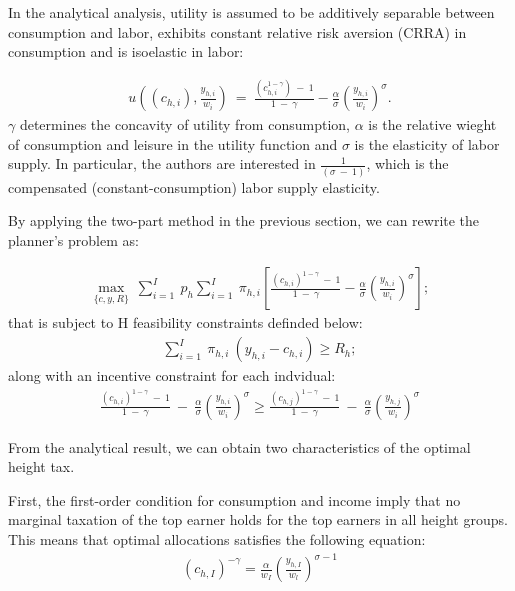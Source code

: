 \documentclass[titlepage]{\econtex}
\begin{document}
In the analytical analysis, utility is assumed to be additively separable between consumption and labor, exhibits constant relative risk aversion (CRRA) in consumption and is isoelastic in labor:

   \begin{align}
  u\left((c_{h,i}), \frac{y_{h,i}}{w_i}\right) \ = \ \frac{(c_{h,i}^{1-\gamma}) \ - \ 1}{1 \ - \ \gamma} - \frac{\alpha}{\sigma} \left(\frac{y_{h,i}}{w_i}\right)^\sigma.
   \end{align}
$\gamma$ determines the concavity of utility from consumption,  $\alpha$ is the relative wieght of consumption and leisure in the utility function and $\sigma$ is the elasticity of labor supply. In particular, the authors are interested in $\frac{1}{(\sigma \ - \ 1)}$, which is the compensated (constant-consumption) labor supply elasticity.

By applying the two-part method in the previous section, we can rewrite the planner's problem as:

\begin{align}
\max_{\{c,y,R\}} \ \sum_{i=1}^I \ p_{h} \sum_{i=1}^I \ \pi_{h,i} \left[ \frac{(c_{h,i})^{1-\gamma} \ - \ 1}{1 \ - \ \gamma} - \frac{\alpha}{\sigma} \left(\frac{y_{h,i}}{w_i}\right)^\sigma \right];
\end{align}  
that is subject to H feasibility constraints definded below:
\begin{align}
    \sum_{i=1}^I \ \pi_{h,i} \ (y_{h,i} - c_{h,i}) \geq R_h ;
 \end{align}
 along with an incentive constraint for each indvidual:
 \begin{align}
   \frac{(c_{h,i})^{1-\gamma} \ - \ 1}{1 \ - \ \gamma} \ - \  \frac{\alpha}{\sigma} \left(\frac{y_{h,i}}{w_i}\right)^\sigma \geq \frac{(c_{h,j})^{1-\gamma} \ - \ 1}{1 \ - \ \gamma} \ - \  \frac{\alpha}{\sigma} \left(\frac{y_{h,j}}{w_i}\right)^\sigma
\end{align}

From the analytical result, we can obtain two characteristics of the optimal height tax.

First, the first-order condition for consumption and income imply that no marginal taxation of the top earner holds for the top earners in all height groups. This means that optimal allocations satisfies the following equation:
\begin{align}
  (c_{h,I})^{- \gamma}= \frac{\alpha}{w_I}\left( \frac{y_{h,I}}{w_l}\right)^{\sigma - 1}
  \end{align}
\end{document}
